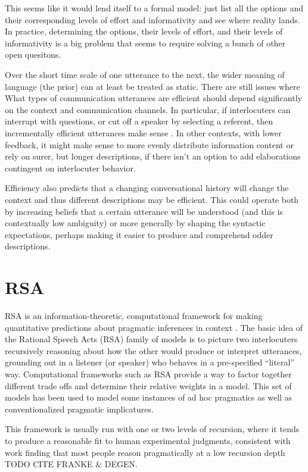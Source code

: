 \documentclass[]{article}
\begin{document}
This seems like it would lend itself to a formal model: just list all the options and their corresponding levels of effort and informativity and see where reality lands. In practice, determining the options, their levels of effort, and their levels of informativity is a big problem that seems to require solving a bunch of other open quesitons. 


Over the short time scale of one utterance to the next, the wider meaning of language (the prior) can at least be treated as static. There are still issues where What types of communication utterances are efficient should depend significantly on the context and communication channels. In particular, if interlocuters can interrupt with questions, or cut off a speaker by selecting a referent, then incrementally efficient utterances make sense \cite{gibson2019}. In other contexts, with lower feedback, it might make sense to more evenly distribute information content or rely on surer, but longer descriptions, if there isn't an option to add elaborations contingent on interlocuter behavior.

Efficiency also predicts that a changing conversational history will change the context and thus different descriptions may be efficient. This could operate both by increasing beliefs that a certain utterance will be understood (and this is contextually low ambiguity) or more generally by shaping the syntactic expectations, perhaps making it easier to produce and comprehend odder descriptions. 

\section{RSA}

RSA is an information-theoretic, computational framework for making quantitative predictions about pragmatic inferences in context \cite{goodman2016, frank2012a}. The basic idea of the Rational Speech Acts (RSA) family of models is to picture two interlocuters recursively reasoning about how the other would produce or interpret utterances, grounding out in a listener (or speaker) who behaves in a pre-specified ``literal'' way. Computational frameworks such as RSA provide a way to factor together different trade offs and determine their relative weights in a model. This set of models has been used to model some instances of ad hoc pragmatics as well as conventionalized pragmatic implicatures. 

This framework is usually run with one or two levels of recursion, where it tends to produce a reasonable fit to human experimental judgments, consistent with work finding that most people reason pragmatically at a low recursion depth TODO CITE FRANKE \& DEGEN. 
\end{document}
